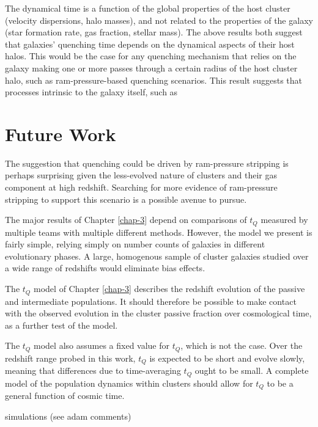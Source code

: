 The dynamical time is a function of the global properties of the host cluster (velocity dispersions, halo masses), and not related to the properties of the galaxy (star formation rate, gas fraction, stellar mass).
The above results both suggest that galaxies' quenching time depends on the dynamical aspects of their host halos.
This would be the case for any quenching mechanism that relies on the galaxy making one or more passes through a certain radius of the host cluster halo, such as ram-pressure-based quenching scenarios.
This result suggests that processes intrinsic to the galaxy itself, such as

\section{Future Work}

The suggestion that quenching could be driven by ram-pressure stripping is perhaps surprising given the less-evolved nature of clusters and their gas component at high redshift.
Searching for more evidence of ram-pressure stripping to support this scenario is a possible avenue to pursue.

The major results of Chapter \ref{chap-3} depend on comparisons of $t_Q$ measured by multiple teams with multiple different methods.
However, the model we present is fairly simple, relying simply on number counts of galaxies in different evolutionary phases.
A large, homogenous sample of cluster galaxies studied over a wide range of redshifts would eliminate bias effects.

The $t_Q$ model of Chapter \ref{chap-3} describes the redshift evolution of the passive and intermediate populations.
It should therefore be possible to make contact with the observed evolution in the cluster passive fraction over cosmological time, as a further test of the model.

The $t_Q$ model also assumes a fixed value for $t_Q$, which is not the case.
Over the redshift range probed in this work, $t_Q$ is expected to be short and evolve slowly, meaning that differences due to time-averaging $t_Q$ ought to be small.
A complete model of the population dynamics within clusters should allow for $t_Q$ to be a general function of cosmic time.


simulations (see adam comments)
